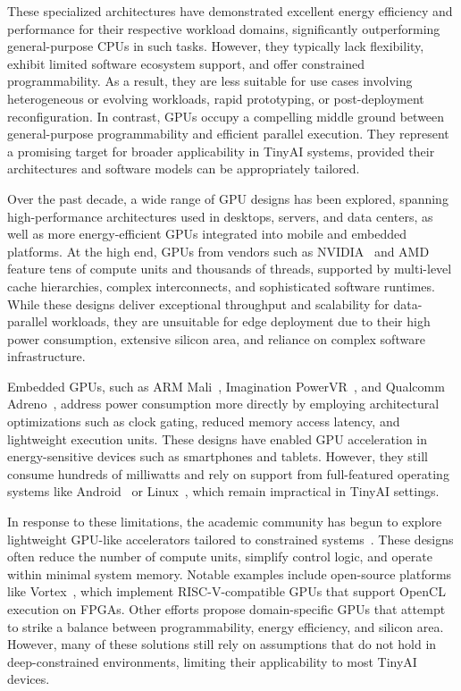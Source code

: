         These specialized architectures have demonstrated excellent energy efficiency and performance for their respective workload domains, significantly outperforming general-purpose CPUs in such tasks. However, they typically lack flexibility, exhibit limited software ecosystem support, and offer constrained programmability. As a result, they are less suitable for use cases involving heterogeneous or evolving workloads, rapid prototyping, or post-deployment reconfiguration. In contrast, GPUs occupy a compelling middle ground between general-purpose programmability and efficient parallel execution. They represent a promising target for broader applicability in TinyAI systems, provided their architectures and software models can be appropriately tailored.
    
        Over the past decade, a wide range of GPU designs has been explored, spanning high-performance architectures used in desktops, servers, and data centers, as well as more energy-efficient GPUs integrated into mobile and embedded platforms. At the high end, GPUs from vendors such as NVIDIA~\cite{nvidia} and AMD~\cite{amd} feature tens of compute units and thousands of threads, supported by multi-level cache hierarchies, complex interconnects, and sophisticated software runtimes. While these designs deliver exceptional throughput and scalability for data-parallel workloads, they are unsuitable for edge deployment due to their high power consumption, extensive silicon area, and reliance on complex software infrastructure.
    
        Embedded GPUs, such as ARM Mali~\cite{arm}, Imagination PowerVR~\cite{imagtech}, and Qualcomm Adreno~\cite{qualcomm}, address power consumption more directly by employing architectural optimizations such as clock gating, reduced memory access latency, and lightweight execution units. These designs have enabled GPU acceleration in energy-sensitive devices such as smartphones and tablets. However, they still consume hundreds of milliwatts and rely on support from full-featured operating systems like Android~\cite{android} or Linux~\cite{linux}, which remain impractical in TinyAI settings.
    
        In response to these limitations, the academic community has begun to explore lightweight GPU-like accelerators tailored to constrained systems~\cite{skybox, metasat, virgo, ventus}. These designs often reduce the number of compute units, simplify control logic, and operate within minimal system memory. Notable examples include open-source platforms like Vortex~\cite{vortex}, which implement RISC-V-compatible GPUs that support OpenCL execution on FPGAs. Other efforts propose domain-specific GPUs that attempt to strike a balance between programmability, energy efficiency, and silicon area. However, many of these solutions still rely on assumptions that do not hold in deep-constrained environments, limiting their applicability to most TinyAI devices.

